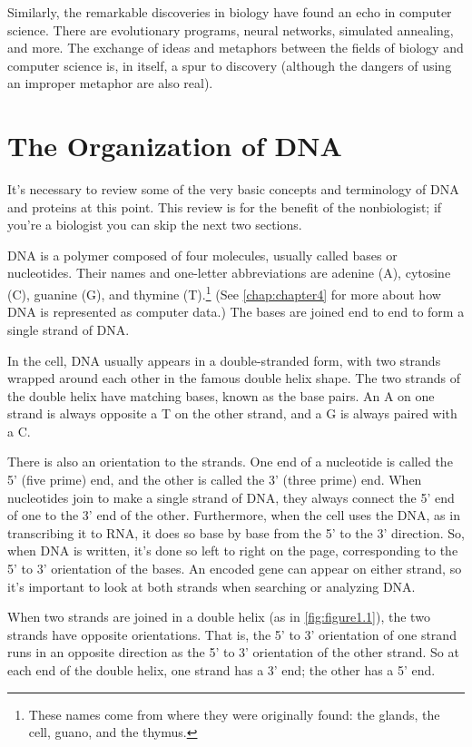 Similarly, the remarkable discoveries in biology have found an echo in computer science. There are evolutionary programs, neural networks, simulated annealing, and more. The exchange of ideas and metaphors between the fields of biology and computer science is, in itself, a spur to discovery (although the dangers of using an improper metaphor are also real). 

\section{The Organization of DNA}
It's necessary to review some of the very basic concepts and terminology of DNA and proteins at this point. This review is for the benefit of the nonbiologist; if you're a biologist you can skip the next two sections.

DNA is a polymer composed of four molecules, usually called bases or nucleotides. Their names and one-letter abbreviations are adenine (A), cytosine (C), guanine (G), and thymine (T).\footnote{These names come from where they were originally found: the glands, the cell, guano, and the thymus.} (See \autoref{chap:chapter4} for more about how DNA is represented as computer data.) The bases are joined end to end to form a single strand of DNA.  

In the cell, DNA usually appears in a double-stranded form, with two strands wrapped around each other in the famous double helix shape. The two strands of the double helix have matching bases, known as the base pairs. An A on one strand is always opposite a T on the other strand, and a G is always paired with a C.

There is also an orientation to the strands. One end of a nucleotide is called the 5' (five prime) end, and the other is called the 3' (three prime) end. When nucleotides join to make a single strand of DNA, they always connect the 5' end of one to the 3' end of the other. Furthermore, when the cell uses the DNA, as in transcribing it to RNA, it does so base by base from the 5' to the 3' direction. So, when DNA is written, it's done so left to right on the page, corresponding to the 5' to 3' orientation of the bases. An encoded gene can appear on either strand, so it's important to look at both strands when searching or analyzing DNA.

When two strands are joined in a double helix (as in \autoref{fig:figure1.1}), the two strands have opposite orientations. That is, the 5' to 3' orientation of one strand runs in an opposite direction as the 5' to 3' orientation of the other strand. So at each end of the double helix, one strand has a 3' end; the other has a 5' end.

